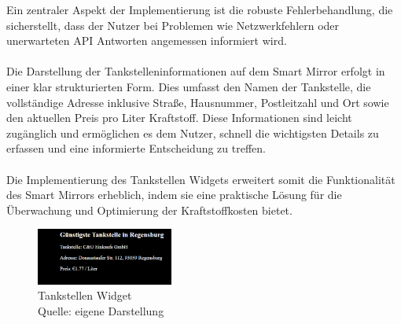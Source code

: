 \noindent
Ein zentraler Aspekt der Implementierung ist die robuste Fehlerbehandlung, die sicherstellt, dass der Nutzer bei Problemen wie Netzwerkfehlern oder unerwarteten API Antworten angemessen informiert wird.  \\ \\
\noindent
Die Darstellung der Tankstelleninformationen auf dem Smart Mirror erfolgt in einer klar strukturierten Form. Dies umfasst den Namen der Tankstelle, die vollständige Adresse inklusive Straße, Hausnummer, Postleitzahl und Ort sowie den aktuellen Preis pro Liter Kraftstoff. Diese Informationen sind leicht zugänglich und ermöglichen es dem Nutzer, schnell die wichtigsten Details zu erfassen und eine informierte Entscheidung zu treffen. \\ \\
\noindent
Die Implementierung des Tankstellen Widgets erweitert somit die Funktionalität des Smart Mirrors erheblich, indem sie eine praktische Lösung für die Überwachung und Optimierung der Kraftstoffkosten bietet.

\begin{figure}[h]
    \centering
    \includegraphics[width=0.4\textwidth]{pictures/gasstation_widget.png}
  \captionsetup{justification=centering, labelformat=simple, singlelinecheck=false}
    \caption[Tankstellen Widget]{Tankstellen Widget\\ Quelle: eigene Darstellung}
\end{figure}

